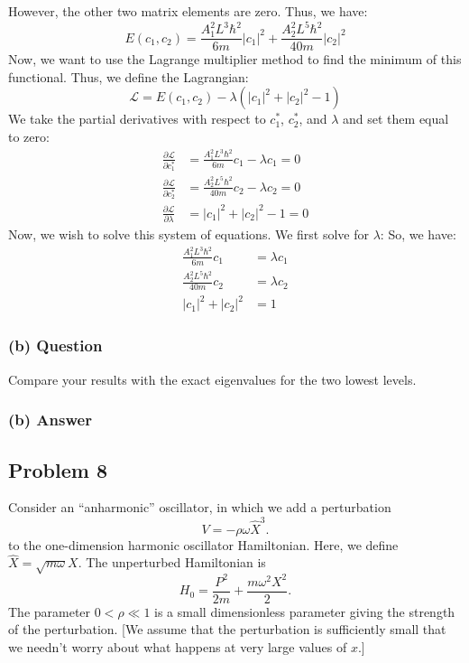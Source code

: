 \documentclass{article}
\begin{document}
However, the other two matrix elements are zero. Thus, we have:
\begin{equation}
    E(c_1, c_2) = \frac{A_1^2L^3\hbar^2}{6m}|c_1|^2 + \frac{A_2^2L^5\hbar^2}{40m}|c_2|^2
\end{equation}
Now, we want to use the Lagrange multiplier method to find the minimum of this functional. Thus, we define the Lagrangian:
\begin{equation}
    \mathcal{L} = E(c_1, c_2) - \lambda(|c_1|^2 + |c_2|^2 - 1)
\end{equation}
We take the partial derivatives with respect to $c_1^*$, $c_2^*$, and $\lambda$ and set them equal to zero:
\begin{align}
    \frac{\partial \mathcal{L}}{\partial c_1^*} &= \frac{A_1^2L^3\hbar^2}{6m}c_1 - \lambda c_1 = 0 \\
    \frac{\partial \mathcal{L}}{\partial c_2^*} &= \frac{A_2^2L^5\hbar^2}{40m}c_2 - \lambda c_2 = 0 \\
    \frac{\partial \mathcal{L}}{\partial \lambda} &= |c_1|^2 + |c_2|^2 - 1 = 0
\end{align}
Now, we wish to solve this system of equations. We first solve for $\lambda$:
So, we have:
\begin{align}
    \frac{A_1^2L^3\hbar^2}{6m}c_1 &= \lambda c_1 \\
    \frac{A_2^2L^5\hbar^2}{40m}c_2 &= \lambda c_2 \\
    |c_1|^2 + |c_2|^2 &= 1
\end{align}


\subsubsection*{(b) Question}
Compare your results with the exact eigenvalues for the two lowest levels.

\subsubsection*{(b) Answer}

\subsection*{Problem 8}
Consider an ``anharmonic'' oscillator, in which we add a perturbation
\begin{equation}
    V = -\rho \omega \hat{X}^3.
\end{equation}
to the one-dimension harmonic oscillator Hamiltonian. Here, we define $ \hat{X} = \sqrt{m\omega}X$. The unperturbed Hamiltonian is
\begin{equation}
    H_0 = \frac{P^2}{2m} + \frac{m\omega^2 X^2}{2}.
\end{equation}
The parameter \( 0 < \rho \ll 1 \) is a small dimensionless parameter giving the strength of the perturbation. [We assume that the perturbation is sufficiently small that we needn't worry about what happens at very large values of \( x \).]
\end{document}

